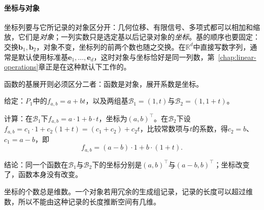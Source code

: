 \paragraph{坐标与对象}
坐标列要与它所记录的对象区分开：几何位移、有限信号、多项式都可以相加和缩放，它们是\emph{对象}；一列实数只是选定基以后记录对象的\emph{坐标}。基的顺序也要固定：交换$\bm b_1,\bm b_2$，对象不变，坐标列的前两个数也随之交换。在$\mathbb R^d$中直接写数字列，通常是默认使用标准基$\bm e_1,\ldots,\bm e_d$，这时对象与坐标恰好是同一列数，第~\ref{chap:linear-operations}章正是在这种默认下工作的。

函数的基展开则必须区分二者：函数是对象，展开系数是坐标。
\begin{example}[仿射函数在两组基下的坐标]
\label{ex:ls-affine-function-coordinates}
给定：$P_1$中的$f_{a,b}=a+bt$，以及两组基$\mathcal B_1=(1,t)$与$\mathcal B_2=(1,1+t)$。

计算：在$\mathcal B_1$下$f_{a,b}=a\cdot1+b\cdot t$，坐标为$(a,b)^\top$。在$\mathcal B_2$下设$f_{a,b}=c_1\cdot1+c_2(1+t)=(c_1+c_2)+c_2t$，比较常数项与$t$的系数，得$c_2=b$、$c_1=a-b$，即
\[
 f_{a,b}=(a-b)\cdot1+b\cdot(1+t).
\]

结论：同一个函数在$\mathcal B_1$与$\mathcal B_2$下的坐标分别是$(a,b)^\top$与$(a-b,b)^\top$；坐标改变了，函数本身没有改变。
\end{example}
坐标的个数总是维数。一个对象若用冗余的生成组记录，记录的长度可以超过维数，所以不能由这种记录的长度推断空间有几维。

